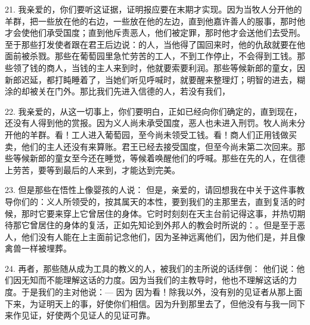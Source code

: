21. 我亲爱的，你们要听这证据，证明报应要在末期才实现。因为当牧人分开他的羊群，把一些放在他的右边，一些放在他的左边，直到他嘉许善人的服事，那时他才会使他们承受国度；直到他斥责恶人，他们被定罪，那时他才会送他们去受刑。至于那些打发使者跟在君王后边说：的人，当他得了国回来时，他的仇敌就要在他面前被杀戮。那些在葡萄园里急忙劳苦的工人，不到工作停止，不会得到工钱。那些领了钱的商人，当钱的主人来到时，他就要索要利润。那些等候新郎的童女，因新郎迟延，都打盹睡着了，当她们听见呼喊时，就要醒来整理灯；明智的进去，糊涂的却被关在门外。那比我们先进入信德的人，若没有我们，\par

22. 我亲爱的，从这一切事上，你们要明白，正如已经向你们确定的，直到现在，还没有人得到他的赏报。因为义人尚未承受国度，恶人也未进入刑罚。牧人尚未分开他的羊群。看！工人进入葡萄园，至今尚未领受工钱。看！商人们正用钱做买卖，他们的主人还没有来算账。君王已经去接受国度，但至今尚未第二次回来。那些等候新郎的童女至今还在睡觉，等候着唤醒他们的呼喊。那些在先的人，在信德上劳苦，要等到最后的人来到，才能达到完美。\par

23. 但是那些在悟性上像婴孩的人说： 但是，亲爱的，请回想我在中关于这件事教导你们的：义人所领受的，按其属天的本性，要到我们的主那里去，直到复活的时候，那时它要来穿上它曾居住的身体。它时时刻刻在天主台前记得这事，并热切期待那它曾居住的身体的复活，正如先知论到外邦人的教会时所说的：。但是至于恶人，他们没有人能在上主面前记念他们，因为圣神远离他们，因为他们是，并且像禽兽一样被埋葬。\par

24. 再者，那些随从成为工具的教义的人，被我们的主所说的话绊倒： 他们说：他们因无知而不能理解这话的力度。因为当我们的主教导时，他也不理解这话的力度。于是我们的主对他说：— 因为 因为看！除我以外，没有别的见证者从那上面下来，为证明天上的事，好使你们相信。因为升到那里去了，但他没有与我一同下来作见证，好使两个见证人的见证可靠。\par

